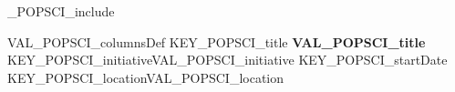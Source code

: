 %
\ifVAL_POPSCI_include %
\begin{myTableEnv}{VAL_POPSCI_columnsDef}
    \myRow
        {KEY_POPSCI_title}
        {\bfseries VAL_POPSCI_title}
        {KEY_POPSCI_initiative}{VAL_POPSCI_initiative}
    \myRow
        {KEY_POPSCI_startDate}{}
        {KEY_POPSCI_location}{VAL_POPSCI_location}
\end{myTableEnv}
%
\fi
%